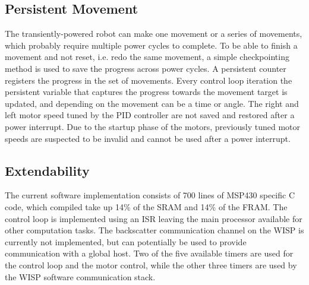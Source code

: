 \subsection{Persistent Movement}
The transiently-powered robot can make one movement or a series of movements, which probably require multiple power cycles to complete.
To be able to finish a movement and not reset, i.e. redo the same movement, a simple checkpointing method is used to save the progress across power cycles.
A persistent counter registers the progress in the set of movements.
Every control loop iteration the persistent variable that captures the progress towards the movement target is updated, and depending on the movement can be a time or angle.
The right and left motor speed tuned by the PID controller are not saved and restored after a power interrupt.
Due to the startup phase of the motors, previously tuned motor speeds are suspected to be invalid and cannot be used after a power interrupt. 

\subsection{Extendability}
The current software implementation consists of 700 lines of MSP430 specific C code, which compiled take up 14\% of the SRAM and 14\% of the FRAM.
The control loop is implemented using an ISR leaving the main processor available for other computation tasks.
The backscatter communication channel on the WISP is currently not implemented, but can potentially be used to provide communication with a global host. 
Two of the five available timers are used for the control loop and the motor control, while the other three timers are used by the WISP software communication stack.